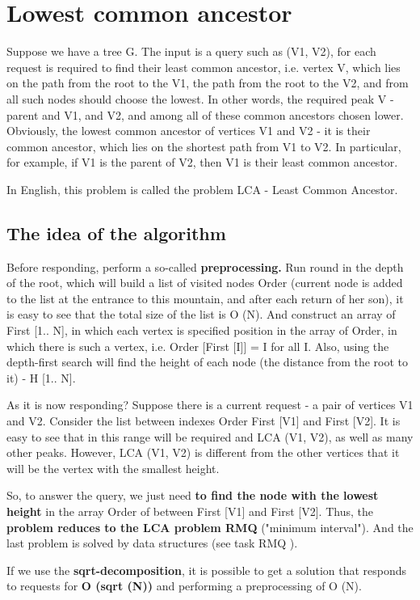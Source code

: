 \section{ Lowest common ancestor }
Suppose we have a tree G. The input is a query such as (V1, V2), for each request is required to find their least common ancestor, i.e. vertex V, which lies on the path from the root to the V1, the path from the root to the V2, and from all such nodes should choose the lowest. In other words, the required peak V - parent and V1, and V2, and among all of these common ancestors chosen lower. Obviously, the lowest common ancestor of vertices V1 and V2 - it is their common ancestor, which lies on the shortest path from V1 to V2. In particular, for example, if V1 is the parent of V2, then V1 is their least common ancestor.

In English, this problem is called the problem LCA - Least Common Ancestor.

\subsection{ The idea of ​​the algorithm }
Before responding, perform a so-called \textbf{preprocessing.} Run round in the depth of the root, which will build a list of visited nodes Order (current node is added to the list at the entrance to this mountain, and after each return of her son), it is easy to see that the total size of the list is O (N). And construct an array of First [1.. N], in which each vertex is specified position in the array of Order, in which there is such a vertex, i.e. Order [First [I]] = I for all I. Also, using the depth-first search will find the height of each node (the distance from the root to it) - H [1.. N].

As it is now responding? Suppose there is a current request - a pair of vertices V1 and V2. Consider the list between indexes Order First [V1] and First [V2]. It is easy to see that in this range will be required and LCA (V1, V2), as well as many other peaks. However, LCA (V1, V2) is different from the other vertices that it will be the vertex with the smallest height.

So, to answer the query, we just need \textbf{to find the node with the lowest height} in the array Order of between First [V1] and First [V2]. Thus, the \textbf{problem reduces to the LCA problem RMQ} ("minimum interval"). And the last problem is solved by data structures (see task RMQ ).

If we use the \textbf{sqrt-decomposition}, it is possible to get a solution that responds to requests for \textbf{O (sqrt (N))} and performing a preprocessing of O (N).

